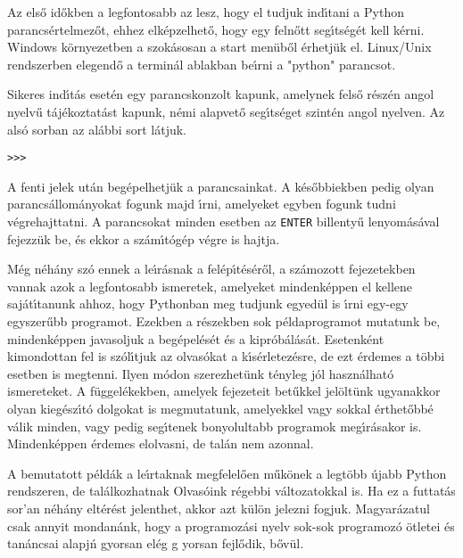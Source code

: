\documentclass[12pt]{article}
\begin{document}
Az els\H{o} id\H{o}kben a legfontosabb az lesz, hogy el tudjuk ind\'{\i}tani a Python 
parancs\-\'er\-tel\-me\-z\H{o}t, ehhez elk\'epzelhet\H{o}, hogy egy feln\H{o}tt seg\'{\i}ts\'eg\'et 
kell k\'erni. Windows k\"ornyezetben a szok\'asosan a start men\"ub\H{o}l \'erhetj\"uk el. 
Linux/Unix rendszerben elegend\H{o} a termin\'al ablakban be\'{\i}rni a "python" parancsot.

Sikeres ind\'{\i}t\'as eset\'en egy parancskonzolt kapunk, amelynek fels\H{o} 
r\'esz\'en an\-gol nyel\-v\H{u} t\'a\-j\'e\-koz\-ta\-t\'ast kapunk, n\'emi alapvet\H{o} seg\'{\i}ts\'eget 
szint\'en angol nyelven. Az als\'o sorban az al\'abbi sort l\'atjuk.

\begin{Verbatim}[fontsize=\small]
>>> 
\end{Verbatim}

\noindent A fenti jelek ut\'an beg\'epelhetj\"uk a parancsainkat. A k\'es\H{o}bbiekben pedig olyan 
parancs\'allom\'anyokat fogunk majd \'{\i}rni, amelyeket egyben fogunk tudni v\'egre\-hajt\-tat\-ni.	
A parancsokat minden esetben az {\tt ENTER} billenty\H{u} lenyom\'as\'aval fejezz\"uk be, \'es 
ekkor a sz\'am\'{\i}t\'og\'ep v\'egre is hajtja.

M\'eg n\'eh\'any sz\'o ennek a le\'{\i}r\'asnak a fel\'ep\'{\i}t\'es\'er\H{o}l, a sz\'amozott 
fejezetekben vannak azok a legfontosabb ismeretek, amelyeket mindenk\'eppen el kellene saj\'at\'{\i}tanunk 
ahhoz, hogy Pythonban meg tudjunk egyed\"ul is \'{\i}rni egy-egy egyszer\H{u}bb programot. Ezekben a 
r\'eszekben sok p\'eldaprogramot mutatunk be, mindenk\'eppen javasoljuk a beg\'epel\'es\'et \'es a 
kipr\'ob\'al\'as\'at. Esetenk\'ent kimondottan fel is sz\'ol\'{\i}tjuk az olvas\'okat a k\'{\i}s\'erletez\'esre, 
de ezt \'erdemes a t\"obbi esetben is megtenni. Ilyen m\'odon szerezhet\"unk t\'enyleg j\'ol haszn\'alhat\'o 
ismereteket. A f\"uggel\'ekekben, amelyek fejezeteit bet\H{u}k\-kel jel\"olt\"unk ugyanakkor olyan 
kieg\'esz\'{\i}t\'o dolgokat is megmutatunk, amelyekkel vagy sokkal \'erthet\H{o}bb\'e v\'alik minden, 
vagy pedig seg\'{\i}tenek bonyolultabb programok meg\'{\i}r\'a\-sa\-kor is. Mindenk\'eppen \'er\-de\-mes 
elolvasni, de tal\'an nem azonnal.

A bemutatott p\'eld\'ak a le\'{\i}rtaknak megfelel\H{o}en m\H{u}k\"onek a legt\"obb \'ujabb Python rendszeren, 
de tal\'alkozhatnak Olvas\'oink r\'egebbi v\'altozatokkal is. Ha ez a futtat\'as sor'an n\'eh\'any elt\'er\'est 
jelenthet, akkor azt k\"ul\"on jelezni fogjuk. Magyar\'azatul csak annyit mondan\'ank, hogy a programoz\'asi 
nyelv sok-sok programoz\'o \"otletei \'es tan\'ancsai alapj\'n gyorsan el\'eg g yorsan fejl\H{o}dik, b\H{o}v\"ul.
\end{document}
